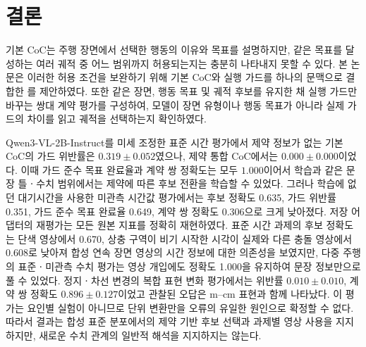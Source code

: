 \section{결론}
\label{sec:conclusion}

기본 CoC는 주행 장면에서 선택한 행동의 이유와 목표를 설명하지만, 같은 목표를 달성하는 여러 궤적 중 어느 범위까지 허용되는지는 충분히 나타내지 못할 수 있다. 본 논문은 이러한 허용 조건을 보완하기 위해 기본 CoC와 실행 가드를 하나의 문맥으로 결합한 \sccoc{}를 제안하였다. 또한 같은 장면, 행동 목표 및 궤적 후보를 유지한 채 실행 가드만 바꾸는 쌍대 계약 평가를 구성하여, 모델이 장면 유형이나 행동 목표가 아니라 실제 가드의 차이를 읽고 궤적을 선택하는지 확인하였다.

Qwen3-VL-2B-Instruct를 미세 조정한 표준 시간 평가에서 제약 정보가 없는 기본 CoC의 가드 위반률은 $0.319\pm0.052$였으나, 제약 통합 CoC에서는 $0.000\pm0.000$이었다. 이때 가드 준수 목표 완료율과 계약 쌍 정확도는 모두 $1.000$이어서 학습과 같은 문장 틀ㆍ수치 범위에서는 제약에 따른 후보 전환을 학습할 수 있었다. 그러나 학습에 없던 대기시간을 사용한 미관측 시간값 평가에서는 후보 정확도 0.635, 가드 위반률 0.351, 가드 준수 목표 완료율 0.649, 계약 쌍 정확도 0.306으로 크게 낮아졌다. 저장 어댑터의 재평가는 모든 원본 지표를 정확히 재현하였다. 표준 시간 과제의 후보 정확도는 단색 영상에서 0.670, 상충 구역이 비기 시작한 시각이 실제와 다른 충돌 영상에서 0.608로 낮아져 합성 연속 장면 영상의 시간 정보에 대한 의존성을 보였지만, 다중 주행의 표준ㆍ미관측 수치 평가는 영상 개입에도 정확도 1.000을 유지하여 문장 정보만으로 풀 수 있었다. 정지ㆍ차선 변경의 복합 표현 변화 평가에서는 위반률 $0.010\pm0.010$, 계약 쌍 정확도 $0.896\pm0.127$이었고 관찰된 오답은 m--cm 표현과 함께 나타났다. 이 평가는 요인별 실험이 아니므로 단위 변환만을 오류의 유일한 원인으로 확정할 수 없다. 따라서 결과는 합성 표준 분포에서의 제약 기반 후보 선택과 과제별 영상 사용을 지지하지만, 새로운 수치 관계의 일반적 해석을 지지하지는 않는다.



